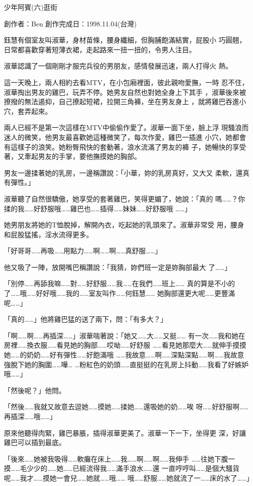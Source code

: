 



少年阿賓(六)逛街

創作者：Ben
創作完成日：1998.11.04(台灣)


鈺慧有個室友叫淑華，身材苗條，腰身纖細，但胸脯飽滿結實，屁股小
巧圓翹，日常都喜歡穿著短薄衣裙，走起路來一扭一扭的，令男人注目。

淑華認識了一個剛剛才服完兵役的男朋友，感情發展迅速，兩人打得火
熱。

這一天晚上，兩人相約去看MTV，在小包廂裡面，彼此親吻愛撫，一時
忍不住，淑華掏出男友的雞巴，玩弄不停。她男友自然也對她全身上下其手
，淑華後來被撩撥的無法遏抑，自己撩起短裙，拉開三角褲，坐在男友身上
，就將雞巴吞進小穴，套弄起來。

兩人已經不是第一次這樣在MTV中偷偷作愛了。淑華一面下坐，臉上浮
現騷浪而迷人的微笑，他男友最喜歡她這種微笑了，每次作愛，雞巴一插進
小穴，她都會有這樣子的浪笑。她粉臀飛快的套動著，浪水流滿了男友的褲
子，她暢快的享受著，又牽起男友的手掌，要他撫摸她的胸部。

男友一邊揉著她的乳房，一邊稱讚說：「小華，妳的乳房真好，又大又
柔軟，還真有彈性。」

淑華聽了自然很驕傲，她享受的套著雞巴，笑得更媚了，她說：「真的
嗎……？你揉的我……好舒服哦……雞巴也……插得……妹妹……好舒服哦
……」

她男朋友將她的T恤脫掉，解開內衣，吃起她的乳頭來了。淑華非常受
用，腰身和屁股猛搖，淫水流得更多。

「好哥哥……再吸……用點力……啊……啊……真舒服……」

他又吸了一陣，放開嘴巴稱讚說：「我猜，妳們班一定是妳胸部最大
了……」

「別停……再舔我嘛……對……好舒服……我……在我們……班上……
真的算是不小的了……哦……好好哦……我的……室友叫作……何鈺慧……
她胸部還更大呢……更豐滿呢……」

「真的……」他將雞巴猛的送了兩下，問：「有多大？」

「啊……啊……再插深……」淑華喘著說：「她又……大……又挺……
有一次……我和她在房裡……換衣服……看見她的胸部……哎呦……好舒服
……看見她那麼大……就伸手摸摸她……的奶奶……好有彈性……好飽滿哦
……我故意……啊……深點深點……啊……我故意強脫下她的胸圍……嘩…
…粉紅色的奶頭……直挺挺的在乳房上抖動……我看了好嫉妒哦……」

「然後呢？」他問。

「然後……我就又故意去逗她……摸她……揉她……還吸她的奶……唉
呀……好舒服啊……再插深……哦……」

原來他聽得肉緊，雞巴暴脹，插得淑華更美了。淑華一下一下，坐得更
深，好讓雞巴可以插到最底。

「後來……她被我吸得……軟癱在床上……我……啊……啊……我伸手
……往她下腹一摸……毛少少的……她……已經流得我……滿手浪水……還
一直哼哼叫……是個大騷貨呢……我才……摸她一會兒……她就……哦……
哦……舒服……她就流了一……床的水了……」

